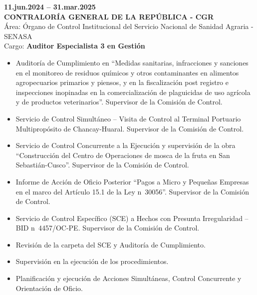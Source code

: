 \documentclass[11pt,a4paper]{article}
\begin{document}
\noindent
\textbf{11.jun.2024 -- 31.mar.2025}\\
\textbf{CONTRALOR\'IA GENERAL DE LA REP\'UBLICA - CGR}\\
\'Area: \'Organo de Control Institucional del Servicio Nacional de Sanidad Agraria - SENASA\\
Cargo: \textbf{Auditor Especialista 3 en Gesti\'on}
\begin{itemize}
\item Auditor\'ia de Cumplimiento en ``Medidas sanitarias, infracciones y sanciones en el monitoreo de residuos qu\'imicos y otros contaminantes en alimentos agropecuarios primarios y piensos, y en la fiscalizaci\'on post registro e inspecciones inopinadas en la comercializaci\'on de plaguicidas de uso agr\'icola y de productos veterinarios''. Supervisor de la Comisi\'on de Control.
\item Servicio de Control Simult\'aneo -- Visita de Control al Terminal Portuario Multiprop\'osito de Chancay-Huaral. Supervisor de la Comisi\'on de Control.
\item Servicio de Control Concurrente a la Ejecuci\'on y supervisi\'on de la obra ``Construcci\'on del Centro de Operaciones de mosca de la fruta en San Sebasti\'an-Cusco''. Supervisor de la Comisi\'on de Control.
\item Informe de Acci\'on de Oficio Posterior ``Pagos a Micro y Peque\~nas Empresas en el marco del Art\'iculo 15.1 de la Ley n\textdegree~30056''. Supervisor de la Comisi\'on de Control.
\item Servicio de Control Espec\'ifico (SCE) a Hechos con Presunta Irregularidad -- BID n\textdegree~4457/OC-PE. Supervisor de la Comisi\'on de Control.
\item Revisi\'on de la carpeta del SCE y Auditor\'ia de Cumplimiento.
\item Supervisi\'on en la ejecuci\'on de los procedimientos.
\item Planificaci\'on y ejecuci\'on de Acciones Simult\'aneas, Control Concurrente y Orientaci\'on de Oficio.
\end{itemize}
\end{document}
